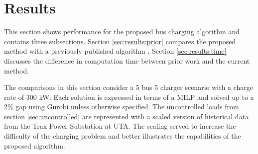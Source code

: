 \section{Results\label{sec:results}}
This section shows performance for the proposed bus charging algorithm and contains three subsections. Section \ref{sec:results:prior} compares the proposed method with a previously published algorithm \cite{He_2019_Fast}. Section \ref{sec:results:time} discusses the difference in computation time between prior work and the current method.
\par The comparisons in this section consider a 5 bus 5 charger scenario with a charge rate of 300 kW. Each solution is expressed in terms of a MILP and solved up to a 2\% gap using Gurobi \cite{gurobi} unless otherwise specified. The uncontrolled loads from section \ref{sec:uncontrolled} are represented with a scaled version of historical data from the Trax Power Substation at UTA. The scaling served to increase the difficulty of the charging problem and better illustrates the capabilities of the proposed algorithm. 

